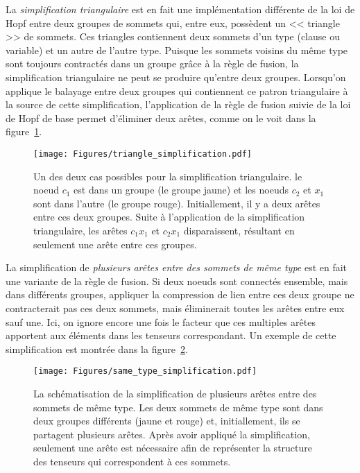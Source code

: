 La \emph{simplification triangulaire} est en fait une implémentation différente de la loi de Hopf entre deux groupes de sommets qui, entre eux, possèdent un << triangle >> de sommets.
Ces triangles contiennent deux sommets d'un type (clause ou variable) et un autre de l'autre type.
Puisque les sommets voisins du même type sont toujours contractés dans un groupe grâce à la règle de fusion, la simplification triangulaire ne peut se produire qu'entre deux groupes.
Lorsqu'on applique le balayage entre deux groupes qui contiennent ce patron triangulaire à la source de cette simplification, l'application de la règle de fusion suivie de la loi de Hopf de base permet d'éliminer deux arêtes, comme on le voit dans la figure~\ref{fig:triangle_rule}.
\begin{figure}[htbp]
    \centering
    \texttt{[image: Figures/triangle\_simplification.pdf]}
    \caption[Représentation graphique d'un des deux cas possibles pour la simplification triangulaire.]{Un des deux cas possibles pour la simplification triangulaire. le noeud $c_1$ est dans un groupe (le groupe jaune) et les noeuds $c_2$ et $x_1$ sont dans l'autre (le groupe rouge). Initiallement, il y a deux arêtes entre ces deux groupes. Suite à l'application de la simplification triangulaire, les arêtes $c_1x_1$ et $c_2x_1$ disparaissent, résultant en seulement une arête entre ces groupes.}
    \label{fig:triangle_rule}
\end{figure}

La simplification de \emph{plusieurs arêtes entre des sommets de même type} est en fait une variante de la règle de fusion.
Si deux noeuds sont connectés ensemble, mais dans différents groupes, appliquer la compression de lien entre ces deux groupe ne contracterait pas ces deux sommets, mais éliminerait toutes les arêtes entre eux sauf une.
Ici, on ignore encore une fois le facteur que ces multiples arêtes apportent aux éléments dans les tenseurs correspondant.
Un exemple de cette simplification est montrée dans la figure~\ref{fig:same_type_simplification}.
\begin{figure}[htbp]
    \centering
    \texttt{[image: Figures/same\_type\_simplification.pdf]}
    \caption[Représentation graphique de la simplification de plusieurs arêtes entre des sommets de même type.]{La schématisation de la simplification de plusieurs arêtes entre des sommets de même type. Les deux sommets de même type sont dans deux groupes différents (jaune et rouge) et, initiallement, ils se partagent plusieurs arêtes. Après avoir appliqué la simplification, seulement une arête est nécessaire afin de représenter la structure des tenseurs qui correspondent à ces sommets.}
    \label{fig:same_type_simplification}
\end{figure}

